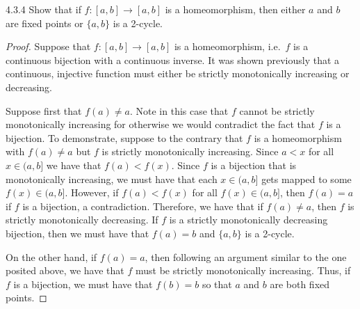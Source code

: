 \begin{problem}{4.3.4}
  Show that if $f: [a, b] \to [a,b]$ is a homeomorphism, then either $a$ and $b$
  are fixed points or $\{a, b\}$ is a 2-cycle.
\end{problem}

\begin{proof}
  Suppose that $f: [a, b] \to [a,b]$ is a homeomorphism, i.e.\ $f$ is a continuous
  bijection with a continuous inverse. It was shown previously that a continuous, injective function
  must either be strictly monotonically increasing or decreasing.

  Suppose first that $f(a) \neq a$. Note in this case that $f$ cannot be strictly monotonically increasing
  for otherwise we would contradict the fact that $f$ is a bijection. To demonstrate,
  suppose to the contrary that $f$ is a homeomorphism with $f(a) \neq a$ but $f$
  is strictly monotonically increasing. Since $a < x$ for all $x\in(a,b]$ we have
  that $f(a) < f(x)$. Since $f$ is a bijection that is monotonically increasing,
  we must have that each $x \in (a, b]$ gets mapped to some $f(x) \in (a, b]$.
  However, if $f(a) < f(x)$ for all $f(x) \in (a, b]$, then $f(a) = a$ if $f$ is a bijection, a contradiction.
  Therefore, we have that if $f(a) \neq a$, then $f$ is strictly monotonically decreasing.
  If $f$ is a strictly monotonically decreasing bijection, then we must have that $f(a) = b$ and $\{a, b\}$
  is a 2-cycle.

  On the other hand, if $f(a) = a$, then following an argument similar to the one posited above,
  we have that $f$ must be strictly monotonically increasing. Thus, if $f$ is a bijection, we must have
  that $f(b) = b$ so that $a$ and $b$ are both fixed points.

\end{proof}
\newpage
